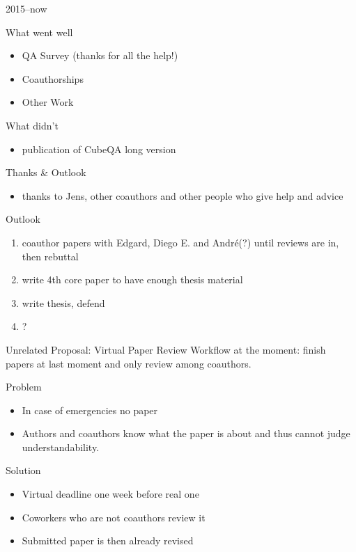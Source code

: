 \documentclass[14pt,aspectratio=1610]{beamer}
\begin{document}
\begin{frame}{2015--now }
\begin{block}{What went well}
\begin{itemize}
\item QA Survey (thanks for all the help!) 
\item Coauthorships 
\item Other Work 
\end{itemize}
\end{block}
\begin{block}{What didn't}
\begin{itemize}
\item publication of CubeQA long version
\end{itemize}
\end{block}
\end{frame}

\begin{frame}{Thanks \& Outlook}
\begin{itemize}
\item thanks to Jens, other coauthors and other people who give help and advice
\end{itemize}
\begin{block}{Outlook}
\begin{enumerate}
\item coauthor papers with Edgard, Diego E. and André(?) until reviews are in, then rebuttal
\item write 4th core paper to have enough thesis material
\item write thesis, defend
\item ?
\end{enumerate}
\end{block}
\end{frame}

\begin{frame}{Unrelated Proposal: Virtual Paper Review}
Workflow at the moment: finish papers at last moment and only review among coauthors.
{
\begin{block}{Problem}
\begin{itemize}
\item In case of emergencies no paper 
\item Authors and coauthors know what the paper is about and thus cannot judge understandability.
\end{itemize}
\end{block}
}
{
\begin{block}{Solution}
\begin{itemize}
\item Virtual deadline one week before real one
\item Coworkers who are not coauthors review it
\item Submitted paper is then already revised 
\end{itemize}
\end{block}
}
\end{frame}
\end{document}
